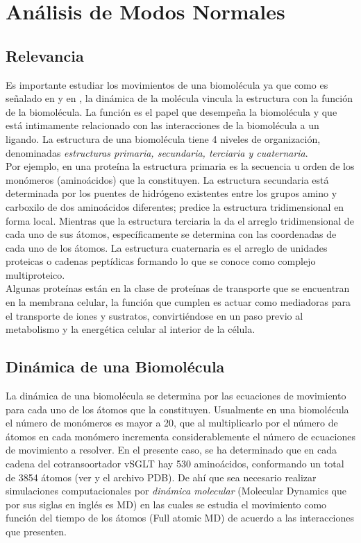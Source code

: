 \chapter{An\'{a}lisis de Modos Normales}
\section{Relevancia}
Es importante estudiar los movimientos de una biomol\'{e}cula ya que como es se\~{n}alado en \cite{Lezon2009} y en  \cite{Rader2006}, la din\'{a}mica de la mol\'{e}cula vincula la estructura con la funci\'{o}n de la biomol\'{e}cula. La funci\'{o}n es el papel que desempe\~{n}a la biomol\'{e}cula y que est\'{a} intimamente relacionado con las interacciones de la biomol\'{e}cula a un ligando. La estructura de una biomol\'{e}cula tiene 4 niveles de organizaci\'{o}n, denominadas \textit{estructuras primaria, secundaria, terciaria y cuaternaria}.\\

Por ejemplo, en una prote\'{i}na la estructura primaria es la secuencia u  orden de los mon\'{o}meros (amino\'{a}cidos) que la constituyen. La estructura secundaria est\'{a} determinada por los puentes de hidr\'{o}geno existentes entre los grupos amino y carboxilo de dos amino\'{a}cidos diferentes; predice la estructura tridimensional en forma local. Mientras que la estructura terciaria la da el arreglo tridimensional de cada uno de sus \'{a}tomos, espec\'{i}ficamente se determina con las coordenadas de cada uno de los \'{a}tomos. La estructura cuaternaria es el arreglo de unidades proteicas o cadenas pept\'{i}dicas formando lo que se conoce como complejo multiproteico.\\

Algunas prote\'{i}nas est\'{a}n en la clase de prote\'{i}nas de transporte que se encuentran en la membrana celular, la funci\'{o}n que cumplen es actuar como mediadoras para el transporte de iones y sustratos, convirti\'{e}ndose en un paso previo al metabolismo y la energ\'{e}tica celular al interior de la c\'{e}lula.\\

\section{Din\'{a}mica de una Biomol\'{e}cula}

La din\'{a}mica de una biomol\'{e}cula se determina por las ecuaciones de movimiento para cada uno de los \'{a}tomos que la constituyen. Usualmente en una biomol\'{e}cula el n\'{u}mero de mon\'{o}meros es mayor a 20, que al multiplicarlo por el n\'{u}mero de \'{a}tomos en cada mon\'{o}mero incrementa considerablemente el n\'{u}mero de ecuaciones de movimiento a resolver. En el presente caso, se ha determinado que en cada cadena del cotransoortador vSGLT hay 530 amino\'{a}cidos, conformando un total de 3854 \'{a}tomos (ver \cite{Faham2008} y el archivo PDB). De ah\'{i} que sea necesario realizar simulaciones computacionales por \textit{din\'{a}mica molecular} (Molecular Dynamics que por sus siglas en ingl\'{e}s es MD) en las cuales se estudia el movimiento como funci\'{o}n del tiempo de los \'{a}tomos (Full atomic MD) de acuerdo a las interacciones que presenten.\\

